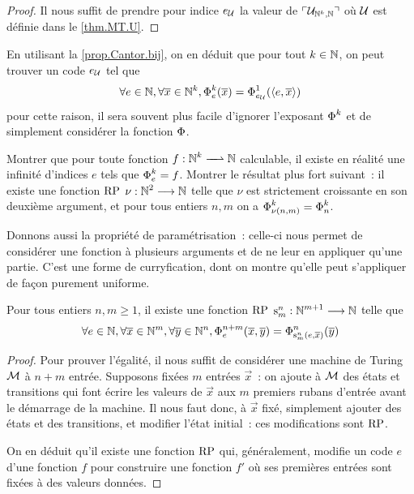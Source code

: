 \begin{proof}
  Il nous suffit de prendre pour indice $e_{\mathcal{U}}$ la valeur de
  $\ulcorner\mathcal{U}_{\mathbb N^k, \mathbb N}\urcorner$ où $\mathcal{U}$ est définie dans le
  \cref{thm.MT.U}.
\end{proof}

\begin{remark}
  En utilisant la \cref{prop.Cantor.bij}, on en déduit que pour tout
  $k \in \mathbb N$, on peut trouver un code $e_{\mathcal{U}}$ tel que
  \[\forall e \in \mathbb N, \forall \overline{x} \in \mathbb N^k,
  \operatorname{\Phi}_{e}^{k} (\overline{x}) = \operatorname{\Phi}_{e_{\mathcal{U}}}^{1} (\langle e, \overline{x} \rangle)\]
  pour cette raison, il sera souvent plus facile d'ignorer l'exposant
  $\operatorname{\Phi}_{}^{k}$ et de simplement considérer la fonction $\operatorname{\Phi}$.
\end{remark}

\begin{exercise}
  Montrer que pour toute fonction $\makeFunNamePartial{f}{\bN^k}{\bN}$
  calculable, il existe en réalité une infinité d'indices $e$ tels que
  $\operatorname{\Phi}_{e}^{k} = f$.
  Montrer le résultat plus fort suivant~: il existe une fonction $\operatorname{RP}$
  $\nu : \displaystyle \mathbb N^2 \longrightarrow \mathbb N$ telle que $\nu$ est strictement
  croissante en son deuxième argument, et pour tous entiers $n,m$ on a
  $\operatorname{\Phi}_{\nu(n,m)}^{k} = \operatorname{\Phi}_{n}^{k}$.
\end{exercise}

Donnons aussi la propriété de paramétrisation~: celle-ci nous permet de
considérer une fonction à plusieurs arguments et de ne leur en appliquer qu'une
partie. C'est une forme de curryfication, dont on montre qu'elle peut
s'appliquer de façon purement uniforme.

\begin{property}[Paramétrisation]
  Pour tous entiers $n,m \geq 1$, il existe une fonction $\operatorname{RP}$
  $\mathrm{s}_{m}^{n} : \displaystyle \mathbb N^{m+1} \longrightarrow \mathbb N$ telle que
  \[\forall e \in \mathbb N, \forall \overline{x} \in \mathbb N^m, \forall \overline{y} \in \mathbb N^n,
  \operatorname{\Phi}_{e}^{n+m}(\overline{x}, \overline{y}) = \operatorname{\Phi}_{\mathrm{s}_{m}^{n}(e,\overline{x})}^{n}(\overline{y})\]
\end{property}

\begin{proof}
  Pour prouver l'égalité, il nous suffit de considérer une machine de Turing
  $\mathcal{M}$ à $n + m$ entrée. Supposons fixées $m$ entrées $\vec x$~: on ajoute
  à $\mathcal{M}$ des états et transitions qui font écrire les valeurs de $\vec x$
  aux $m$ premiers rubans d'entrée avant le démarrage de la machine. Il nous
  faut donc, à $\vec x$ fixé, simplement ajouter des états et des transitions,
  et modifier l'état initial~: ces modifications sont $\operatorname{RP}$.

  On en déduit qu'il existe une fonction $\operatorname{RP}$ qui, généralement, modifie un
  code $e$ d'une fonction $f$ pour construire une fonction $f'$ où ses premières
  entrées sont fixées à des valeurs données.
\end{proof}

